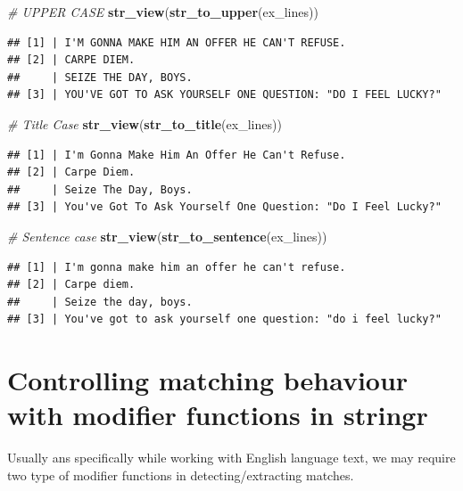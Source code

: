\documentclass[
]{book}
\newenvironment{Shaded}{\begin{snugshade}}{\end{snugshade}}
\newcommand{\CommentTok}[1]{\textcolor[rgb]{0.56,0.35,0.01}{\textit{#1}}}
\newcommand{\FunctionTok}[1]{\textcolor[rgb]{0.13,0.29,0.53}{\textbf{#1}}}
\newcommand{\NormalTok}[1]{#1}
\begin{document}
\begin{Shaded}
\begin{Highlighting}[]
\CommentTok{\# UPPER CASE}
\FunctionTok{str\_view}\NormalTok{(}\FunctionTok{str\_to\_upper}\NormalTok{(ex\_lines))}
\end{Highlighting}
\end{Shaded}

\begin{verbatim}
## [1] | I'M GONNA MAKE HIM AN OFFER HE CAN'T REFUSE.
## [2] | CARPE DIEM.
##     | SEIZE THE DAY, BOYS.
## [3] | YOU'VE GOT TO ASK YOURSELF ONE QUESTION: "DO I FEEL LUCKY?"
\end{verbatim}

\begin{Shaded}
\begin{Highlighting}[]
\CommentTok{\# Title Case}
\FunctionTok{str\_view}\NormalTok{(}\FunctionTok{str\_to\_title}\NormalTok{(ex\_lines))}
\end{Highlighting}
\end{Shaded}

\begin{verbatim}
## [1] | I'm Gonna Make Him An Offer He Can't Refuse.
## [2] | Carpe Diem.
##     | Seize The Day, Boys.
## [3] | You've Got To Ask Yourself One Question: "Do I Feel Lucky?"
\end{verbatim}

\begin{Shaded}
\begin{Highlighting}[]
\CommentTok{\# Sentence case}
\FunctionTok{str\_view}\NormalTok{(}\FunctionTok{str\_to\_sentence}\NormalTok{(ex\_lines))}
\end{Highlighting}
\end{Shaded}

\begin{verbatim}
## [1] | I'm gonna make him an offer he can't refuse.
## [2] | Carpe diem.
##     | Seize the day, boys.
## [3] | You've got to ask yourself one question: "do i feel lucky?"
\end{verbatim}

\hypertarget{controlling-matching-behaviour-with-modifier-functions-in-stringr}{%
\section{Controlling matching behaviour with modifier functions in stringr}\label{controlling-matching-behaviour-with-modifier-functions-in-stringr}}

Usually ans specifically while working with English language text, we may require two type of modifier functions in detecting/extracting matches.
\end{document}
